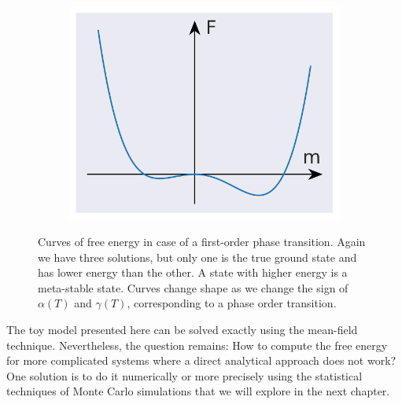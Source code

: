 \begin{figure}[H]
\begin{subfigure}{0.33\textwidth}
		\includegraphics[width=\columnwidth]{figures/introduction/firstOrder-right-state.pdf}
	\end{subfigure}
	\caption{Curves of free energy in case of a first-order phase transition. Again we have three solutions, but only one is the true ground state and has lower energy than the other. A state with higher energy is a meta-stable state. Curves change shape as we change the sign of $\alpha(T)$ and $\gamma(T)$, corresponding to a phase order transition.}
	\label{gr:firstOrderLandau}
\end{figure}
\par
The toy model presented here can be solved exactly using the mean-field technique. Nevertheless, the question remains: How to compute the free energy for more complicated systems where a direct analytical approach does not work? One solution is to do it numerically or more precisely using the statistical techniques of Monte Carlo simulations that we will explore in the next chapter.  

\newpage

